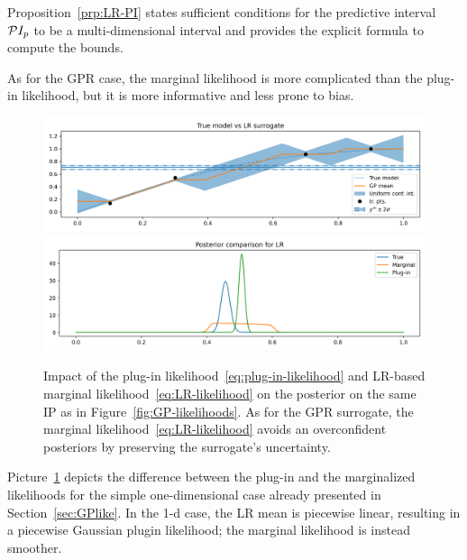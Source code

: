 \begin{rmk}
    Proposition~\ref{prp:LR-PI} states sufficient conditions for the predictive interval $\mathcal PI_p$ to be a multi-dimensional interval and provides the explicit formula to compute the bounds.
\end{rmk}

As for the GPR case, the marginal likelihood is more complicated than the plug-in likelihood, but it is more informative and less prone to bias. 
\begin{figure}[H] 

    \begin{center}
    \includegraphics[width = 360pt]{results/pictures/d1/LR_model_comparison.png}
    \includegraphics[width = 360pt]{results/pictures/d1/LR_posterior_comparison.png}
    \end{center}
    
    \caption{Impact of the plug-in likelihood~\eqref{eq:plug-in-likelihood} and LR-based marginal likelihood~\eqref{eq:LR-likelihood} on the posterior on the same IP as in Figure~\ref{fig:GP-likelihoods}. As for the GPR surrogate, the marginal likelihood~\eqref{eq:LR-likelihood} avoids an overconfident posteriors by preserving the surrogate's uncertainty.} 
    \label{fig:LR-likelihoods}
\end{figure}  

Picture~\ref{fig:LR-likelihoods} depicts the difference between the plug-in and the marginalized likelihoods for the simple one-dimensional case already presented in Section~\ref{sec:GPlike}. 
In the 1-d case, the LR mean is piecewise linear, resulting in a piecewise Gaussian plugin likelihood; the marginal likelihood is instead smoother.